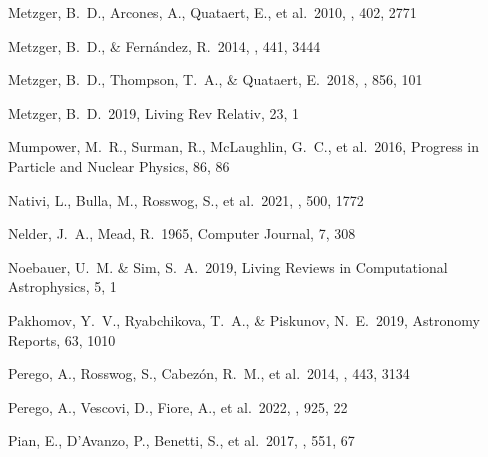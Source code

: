 \documentclass[twocolumn, twocolappendix]{aastex63}
\begin{document}
\begin{thebibliography}{}


 Metzger, B.~D., Arcones, A., Quataert, E., et al.\ 2010, \mnras, 402, 2771




 Metzger, B.~D., \& Fern{\'a}ndez, R.\ 2014, \mnras, 441, 3444


 Metzger, B.~D., Thompson, T.~A., \& Quataert, E.\ 2018, \apj, 856, 101


 Metzger, B.~D.\ 2019, Living Rev Relativ, 23, 1


 Mumpower, M.~R., Surman, R., McLaughlin, G.~C., et al.\ 2016, Progress in Particle and Nuclear Physics, 86, 86


 Nativi, L., Bulla, M., Rosswog, S., et al.\ 2021, \mnras, 500, 1772


 Nelder, J.~A., Mead, R.\ 1965, Computer Journal, 7, 308


 Noebauer, U.~M. \& Sim, S.~A.\ 2019, Living Reviews in Computational Astrophysics, 5, 1



 Pakhomov, Y.~V., Ryabchikova, T.~A., \& Piskunov, N.~E.\ 2019, Astronomy Reports, 63, 1010




 Perego, A., Rosswog, S., Cabez{\'o}n, R.~M., et al.\ 2014, \mnras, 443, 3134


 Perego, A., Vescovi, D., Fiore, A., et al.\ 2022, \apj, 925, 22


 Pian, E., D'Avanzo, P., Benetti, S., et al.\ 2017, \nat, 551, 67



\end{thebibliography}
\end{document}
